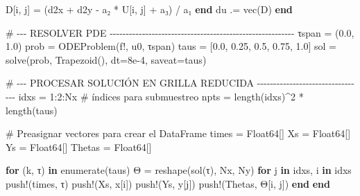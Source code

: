 \documentclass[
  spanish,
  us-letterpaper,
  DIV=11,
  numbers=noendperiod]{scrreprt}
\newenvironment{Shaded}{\begin{snugshade}}{\end{snugshade}}
\newcommand{\CommentTok}[1]{\textcolor[rgb]{0.37,0.37,0.37}{#1}}
\newcommand{\ControlFlowTok}[1]{\textcolor[rgb]{0.00,0.23,0.31}{\textbf{#1}}}
\newcommand{\DataTypeTok}[1]{\textcolor[rgb]{0.68,0.00,0.00}{#1}}
\newcommand{\FloatTok}[1]{\textcolor[rgb]{0.68,0.00,0.00}{#1}}
\newcommand{\FunctionTok}[1]{\textcolor[rgb]{0.28,0.35,0.67}{#1}}
\newcommand{\KeywordTok}[1]{\textcolor[rgb]{0.00,0.23,0.31}{\textbf{#1}}}
\newcommand{\NormalTok}[1]{\textcolor[rgb]{0.00,0.23,0.31}{#1}}
\newcommand{\OperatorTok}[1]{\textcolor[rgb]{0.37,0.37,0.37}{#1}}
\theoremstyle{definition}
\theoremstyle{plain}
\theoremstyle{remark}
\begin{document}
\begin{Shaded}
\begin{Highlighting}[]
\NormalTok{        D[i, j] }\OperatorTok{=}\NormalTok{ (d2x }\OperatorTok{+}\NormalTok{ d2y }\OperatorTok{{-}}\NormalTok{ a₂ }\OperatorTok{*}\NormalTok{ U[i, j] }\OperatorTok{+}\NormalTok{ a₃) }\OperatorTok{/}\NormalTok{ a₁}
    \ControlFlowTok{end}
\NormalTok{    du }\OperatorTok{.=} \FunctionTok{vec}\NormalTok{(D)}
\KeywordTok{end}

\CommentTok{\# {-}{-}{-} RESOLVER PDE {-}{-}{-}{-}{-}{-}{-}{-}{-}{-}{-}{-}{-}{-}{-}{-}{-}{-}{-}{-}{-}{-}{-}{-}{-}{-}{-}{-}{-}{-}{-}{-}{-}{-}{-}{-}{-}{-}{-}{-}{-}{-}{-}{-}{-}{-}{-}{-}{-}{-}{-}{-}{-}{-}{-}{-}{-}}
\NormalTok{τspan }\OperatorTok{=}\NormalTok{ (}\FloatTok{0.0}\NormalTok{, }\FloatTok{1.0}\NormalTok{)}
\NormalTok{prob }\OperatorTok{=} \FunctionTok{ODEProblem}\NormalTok{(f!, u0, τspan)}
\NormalTok{taus }\OperatorTok{=}\NormalTok{ [}\FloatTok{0.0}\NormalTok{, }\FloatTok{0.25}\NormalTok{, }\FloatTok{0.5}\NormalTok{, }\FloatTok{0.75}\NormalTok{, }\FloatTok{1.0}\NormalTok{]}
\NormalTok{sol }\OperatorTok{=} \FunctionTok{solve}\NormalTok{(prob, }\FunctionTok{Trapezoid}\NormalTok{(), dt}\OperatorTok{=}\FloatTok{8e{-}4}\NormalTok{, saveat}\OperatorTok{=}\NormalTok{taus)}

\CommentTok{\# {-}{-}{-} PROCESAR SOLUCIÓN EN GRILLA REDUCIDA {-}{-}{-}{-}{-}{-}{-}{-}{-}{-}{-}{-}{-}{-}{-}{-}{-}{-}{-}{-}{-}{-}{-}{-}{-}{-}{-}{-}{-}{-}{-}{-}{-}}
\NormalTok{idxs }\OperatorTok{=} \FloatTok{1}\OperatorTok{:}\FloatTok{2}\OperatorTok{:}\NormalTok{Nx  }\CommentTok{\# índices para submuestreo}
\NormalTok{npts }\OperatorTok{=} \FunctionTok{length}\NormalTok{(idxs)}\OperatorTok{\^{}}\FloatTok{2} \OperatorTok{*} \FunctionTok{length}\NormalTok{(taus)}

\CommentTok{\# Preasignar vectores para crear el DataFrame}
\NormalTok{times }\OperatorTok{=} \DataTypeTok{Float64}\NormalTok{[]}
\NormalTok{Xs }\OperatorTok{=} \DataTypeTok{Float64}\NormalTok{[]}
\NormalTok{Ys }\OperatorTok{=} \DataTypeTok{Float64}\NormalTok{[]}
\NormalTok{Thetas }\OperatorTok{=} \DataTypeTok{Float64}\NormalTok{[]}

\ControlFlowTok{for}\NormalTok{ (k, τ) }\KeywordTok{in} \FunctionTok{enumerate}\NormalTok{(taus)}
\NormalTok{    Θ }\OperatorTok{=} \FunctionTok{reshape}\NormalTok{(}\FunctionTok{sol}\NormalTok{(τ), Nx, Ny)}
    \ControlFlowTok{for}\NormalTok{ j }\KeywordTok{in}\NormalTok{ idxs, i }\KeywordTok{in}\NormalTok{ idxs}
        \FunctionTok{push!}\NormalTok{(times, τ)}
        \FunctionTok{push!}\NormalTok{(Xs, x[i])}
        \FunctionTok{push!}\NormalTok{(Ys, y[j])}
        \FunctionTok{push!}\NormalTok{(Thetas, Θ[i, j])}
    \ControlFlowTok{end}
\ControlFlowTok{end}


\end{Highlighting}
\end{Shaded}
\end{document}
